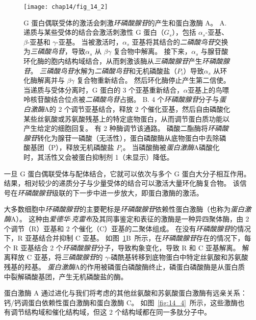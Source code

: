 \begin{figure}[htbp]
	\centering
	\texttt{[image: chap14/fig\_14\_2]}
	\caption{G 蛋白偶联受体的激活会刺激\textit{环磷酸腺苷}的产生和蛋白激酶 A\cite{alberts2017molecular}。
		A. 递质与某些受体的结合会激活刺激性 G 蛋白（$ G_s $），包括 $\alpha_s$-亚基、$\beta$-亚基和 $\gamma$-亚基。
		当被激活时，$\alpha_s$ 亚基将其结合的\textit{二磷酸鸟苷}交换为\textit{三磷酸鸟苷}，导致$\alpha_s$ 从 $\beta \gamma$ 复合物中解离。
		接下来，$\alpha_s$ 与腺苷酸环化酶的胞内结构域结合，从而刺激该酶从\textit{三磷酸腺苷}产生\textit{环磷酸腺苷}。
		\textit{三磷酸鸟苷}水解为\textit{二磷酸鸟苷}和无机磷酸盐（$ P_i $）导致$\alpha_s$ 从环化酶解离并与 $\beta \gamma$ 复合物重新结合。
		然后环化酶停止产生第二信使。
		当递质与受体分离时，G 蛋白的 3 个亚基重新结合，$\alpha$亚基上的鸟嘌呤核苷酸结合位点被\textit{二磷酸鸟苷}占据。
		B. 4 个\textit{环磷酸腺苷}分子与\textit{蛋白激酶}A的 2 个调节亚基结合，释放 2 个催化亚基，然后自由磷酸化某些丝氨酸或苏氨酸残基上的特定底物蛋白，从而调节蛋白质功能以产生给定的细胞回复。
		有 2 种酶调节该通路。
		磷酸二酯酶将\textit{环磷酸腺苷}转化为腺苷一磷酸（无活性），蛋白磷酸酶从底物蛋白中去除磷酸基团（P），释放无机磷酸盐 $ P_i $。
		当磷酸酶被\textit{蛋白激酶}A磷酸化时，其活性又会被蛋白抑制剂 1（未显示）降低。}
	\label{fig:14_2}
\end{figure}


一旦 G 蛋白偶联受体与配体结合，它就可以依次与多个 G 蛋白大分子相互作用。
结果，相对较少的递质分子与少量受体的结合可以激活大量环化酶复合物。
该信号在\textit{环磷酸腺苷}级联的下一步中进一步放大，即蛋白激酶的激活。


大多数细胞中\textit{环磷酸腺苷}的主要靶标是\textit{环磷酸腺苷}依赖性蛋白激酶（也称为\textit{蛋白激酶}A）。
这种由\textit{爱德华$\cdot$克雷布}及其同事鉴定和表征的激酶是一种异四聚体酶，由 2 个调节（R）亚基和 2 个催化（C）亚基的二聚体组成。
在没有\textit{环磷酸腺苷}的情况下，R 亚基结合并抑制 C 亚基。
如图~\ref{fig:14_2}B~所示，在\textit{环磷酸腺苷}存在的情况下，每个 R 亚基结合 2 个\textit{环磷酸腺苷}分子，导致构象变化，导致 R 和 C 亚基解离。
解离释放 C 亚基，将\textit{三磷酸腺苷}的 $\gamma$-磷酰基转移到底物蛋白中特定丝氨酸和苏氨酸残基的羟基。
\textit{蛋白激酶}A的作用被磷蛋白磷酸酶终止，磷蛋白磷酸酶是从蛋白质中裂解磷酸基团，产生无机磷酸盐的酶。


蛋白激酶 A 通过进化与我们将考虑的其他丝氨酸和苏氨酸蛋白激酶有远亲关系：钙/钙调蛋白依赖性蛋白激酶和蛋白激酶 C。
如图~\ref{fig:14_4}~所示，这些激酶也有调节结构域和催化结构域，但这 2 个结构域都在同一多肽分子中。


